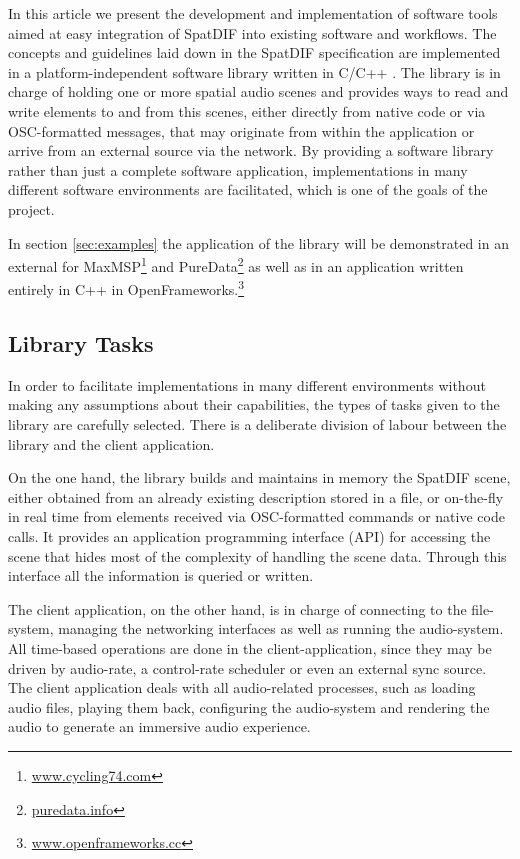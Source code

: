 \documentclass{article}
\begin{document}
In this article we present the development and implementation of software tools aimed at easy integration of SpatDIF into existing software and workflows.
The concepts and guidelines laid down in the SpatDIF specification are implemented in a platform-independent software library written in C/C++ \cite{Miyama_2013}.
The library is in charge of holding one or more spatial audio scenes and provides ways to read and write elements to and from this scenes, either directly from native code or via OSC-formatted messages, that may originate from within the application or arrive from an external source via the network.
By providing a software library rather than just a complete software application, implementations in many different software environments are facilitated, which is one of the goals of the project.

In section \ref{sec:examples} the application of the library will be demonstrated in an external for MaxMSP\footnote{\href{http://www.cycling74.com}{www.cycling74.com}} and PureData\footnote{\href{http://puredata.info}{puredata.info}} as well as in an application written entirely in C++ in OpenFrameworks.\footnote{\href{http://www.openframeworks.cc}{www.openframeworks.cc}}

\subsection{Library Tasks}\label{subsec:separation}

In order to facilitate implementations in many different environments without making any assumptions about their capabilities, the types of tasks given to the library are carefully selected.
There is a deliberate division of labour between the library and the client application.

On the one hand, the library builds and maintains in memory the SpatDIF scene, either obtained from an already existing description stored in a file, or on-the-fly in real time from elements received via OSC-formatted commands or native code calls.
It provides an application programming interface (API) for accessing the scene that hides most of the complexity of handling the scene data.
Through this interface all the information is queried or written.

The client application, on the other hand, is in charge of connecting to the file-system, managing the networking interfaces as well as running the audio-system.
All time-based operations are done in the client-application, since they may be driven by audio-rate, a control-rate scheduler or even an external sync source. 
The client application deals with all audio-related processes, such as loading audio files, playing them back, configuring the audio-system and rendering the audio to generate an immersive audio experience.
\end{document}
